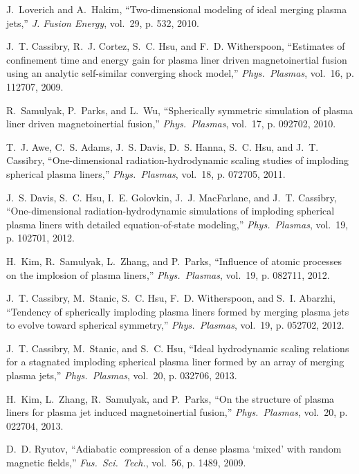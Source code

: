 \documentclass[journal]{IEEEtran}
\begin{document}
\begin{thebibliography}{10}
J.~Loverich and A.~Hakim, ``Two-dimensional modeling of ideal merging plasma
  jets,'' \emph{J. Fusion Energy}, vol.~29, p. 532, 2010.

J.~T. Cassibry, R.~J. Cortez, S.~C. Hsu, and F.~D. Witherspoon, ``Estimates of
  confinement time and energy gain for plasma liner driven magnetoinertial
  fusion using an analytic self-similar converging shock model,'' \emph{Phys.\
  Plasmas}, vol.~16, p. 112707, 2009.

R.~Samulyak, P.~Parks, and L.~Wu, ``Spherically symmetric simulation of plasma
  liner driven magnetoinertial fusion,'' \emph{Phys.\ Plasmas}, vol.~17, p.
  092702, 2010.

T.~J. Awe, C.~S. Adams, J.~S. Davis, D.~S. Hanna, S.~C. Hsu, and J.~T.
  Cassibry, ``One-dimensional radiation-hydrodynamic scaling studies of
  imploding spherical plasma liners,'' \emph{Phys.\ Plasmas}, vol.~18, p.
  072705, 2011.

J.~S. Davis, S.~C. Hsu, I.~E. Golovkin, J.~J. MacFarlane, and J.~T. Cassibry,
  ``One-dimensional radiation-hydrodynamic simulations of imploding spherical
  plasma liners with detailed equation-of-state modeling,'' \emph{Phys.\
  Plasmas}, vol.~19, p. 102701, 2012.

H.~Kim, R.~Samulyak, L.~Zhang, and P.~Parks, ``Influence of atomic processes on
  the implosion of plasma liners,'' \emph{Phys.\ Plasmas}, vol.~19, p. 082711,
  2012.

J.~T. Cassibry, M.~Stanic, S.~C. Hsu, F.~D. Witherspoon, and S.~I. Abarzhi,
  ``Tendency of spherically imploding plasma liners formed by merging plasma
  jets to evolve toward spherical symmetry,'' \emph{Phys.\ Plasmas}, vol.~19,
  p. 052702, 2012.

J.~T. Cassibry, M.~Stanic, and S.~C. Hsu, ``Ideal hydrodynamic scaling
  relations for a stagnated imploding spherical plasma liner formed by an array
  of merging plasma jets,'' \emph{Phys.\ Plasmas}, vol.~20, p. 032706, 2013.

\bibitem{kim13}
H.~Kim, L.~Zhang, R.~Samulyak, and P.~Parks, ``On the structure of plasma
  liners for plasma jet induced magnetoinertial fusion,'' \emph{Phys.\
  Plasmas}, vol.~20, p. 022704, 2013.

\bibitem{ryutov09}
D.~D. Ryutov, ``Adiabatic compression of a dense plasma `mixed' with random
  magnetic fields,'' \emph{Fus.\ Sci.\ Tech.}, vol.~56, p. 1489, 2009.


\end{thebibliography}
\end{document}

